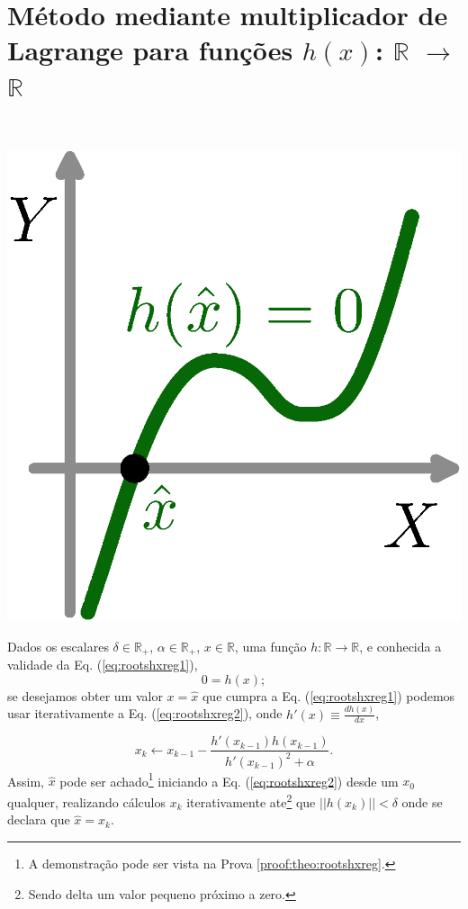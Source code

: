 
\section{ Método mediante multiplicador de Lagrange para funções $h(x)$: $\mathbb{R}$ $\rightarrow$ $\mathbb{R}$ }

\begin{theorem}\label{theo:rootshxreg}
~\\
\begin{minipage}{0.2\textwidth}
\centering
\includegraphics[width=0.90\linewidth]{chapters/roots/roots1.eps} 
\end{minipage}
\begin{minipage}{0.8\textwidth}
Dados
os escalares $\delta \in \mathbb{R}_+$, 
$\alpha \in \mathbb{R}_+$, 
$x \in \mathbb{R}$, 
uma função $h:\mathbb{R} \rightarrow \mathbb{R}$, e 
conhecida a validade da Eq. (\ref{eq:rootshxreg1}),
\begin{equation}\label{eq:rootshxreg1}
0=h(x);
\end{equation}
se desejamos obter um valor $x=\hat{x}$ que cumpra a Eq. (\ref{eq:rootshxreg1})
podemos usar iterativamente a Eq. (\ref{eq:rootshxreg2}),
onde  $h'(x)\equiv \frac{d h(x)}{d x}$,
\end{minipage}

\begin{equation}\label{eq:rootshxreg2}
x_{k} \leftarrow x_{k-1}-\frac{ h'(x_{k-1})h(x_{k-1})}{h'(x_{k-1})^2+\alpha}.
\end{equation}
Assim, $\hat{x}$ pode ser achado\footnote{A 
demonstração pode ser vista na Prova \ref{proof:theo:rootshxreg}.} 
iniciando a Eq. (\ref{eq:rootshxreg2}) desde um 
$x_{0}$ qualquer, realizando cálculos $x_{k}$ iterativamente  
ate\footnote{Sendo delta um valor pequeno próximo a zero.} que $||h(x_k)||<\delta$
onde se declara que $\hat{x}=x_k$.


\end{theorem}

